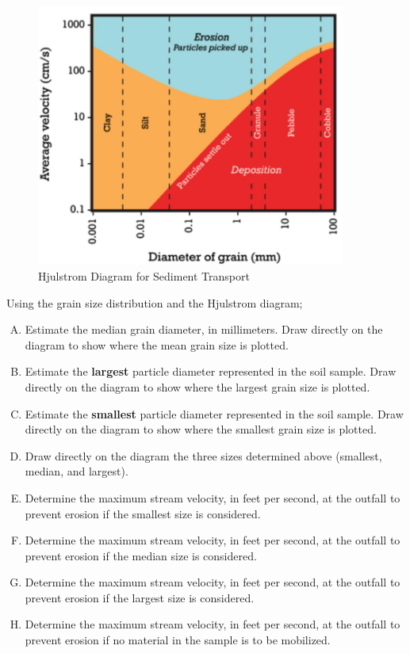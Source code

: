 \documentclass[12pt]{article}
\begin{document}
\begin{enumerate}
\begin{figure}[ht!] %
\centering
   \includegraphics[height=3.4in]{Hjulstrom2.jpg}
   \caption{Hjulstrom Diagram for Sediment Transport}
   \label{fig:Hjulstrom} 
\end{figure}

\clearpage
Using the grain size distribution and the Hjulstrom diagram;

\begin{enumerate}[A)]
\item Estimate the median grain diameter, in millimeters.  Draw directly on the diagram to show where the mean grain size is plotted. ~\\
\item Estimate the \textbf{largest} particle diameter represented in the soil sample.  Draw directly on the diagram to show where the largest grain size is plotted. ~\\
\item Estimate the \textbf{smallest} particle diameter represented in the soil sample.  Draw directly on the diagram to show where the smallest grain size is plotted.
\item Draw directly on the diagram the three sizes determined above (smallest, median, and largest). ~\\ 
\item Determine the maximum stream velocity, in feet per second, at the outfall to prevent erosion if the smallest size is considered.
\item Determine the maximum stream velocity, in feet per second, at the outfall to prevent erosion if the median size is considered. 
\item Determine the maximum stream velocity, in feet per second, at the outfall to prevent erosion if the largest size is considered. ~\\
\item Determine the maximum stream velocity, in feet per second,  at the outfall to prevent erosion if no material in the sample is to be mobilized. ~\\
\end{enumerate}


\end{enumerate}
\end{document}
